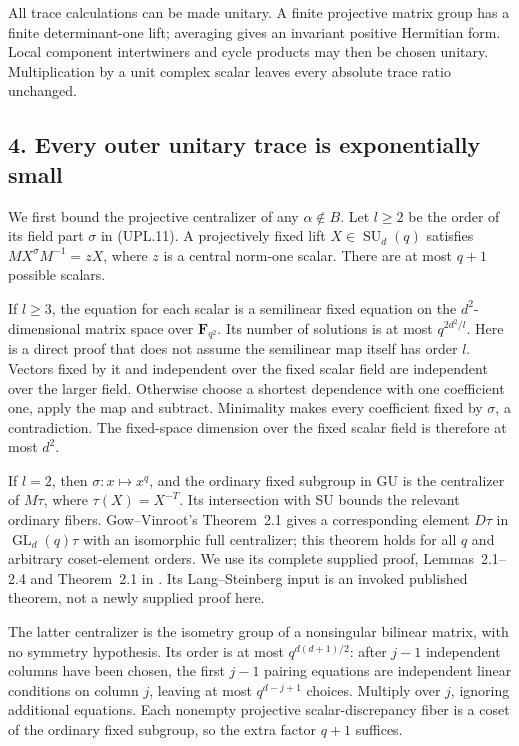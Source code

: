 All trace calculations can be made unitary. A finite projective
matrix group has a finite determinant-one lift; averaging gives an
invariant positive Hermitian form. Local component intertwiners and
cycle products may then be chosen unitary. Multiplication by a
unit complex scalar leaves every absolute trace ratio unchanged.

\subsection*{4. Every outer unitary trace is exponentially small}

We first bound the projective centralizer of any \(\alpha\notin B\).
Let \(l\ge2\) be the order of its field part \(\sigma\) in
(UPL.11). A projectively fixed lift \(X\in\operatorname{SU}_d(q)\)
satisfies \(M X^\sigma M^{-1}=zX\), where \(z\) is a central
norm-one scalar. There are at most \(q+1\) possible scalars.

If \(l\ge3\), the equation for each scalar is a semilinear fixed
equation on the \(d^2\)-dimensional matrix space over
\(\mathbf F_{q^2}\). Its number of solutions is at most
\(q^{2d^2/l}\). Here is a direct proof that does not assume the
semilinear map itself has order \(l\). Vectors fixed by it and
independent over the fixed scalar field are independent over the
larger field. Otherwise choose a shortest dependence with one
coefficient one, apply the map and subtract. Minimality makes every
coefficient fixed by \(\sigma\), a contradiction. The fixed-space
dimension over the fixed scalar field is therefore at most \(d^2\).

If \(l=2\), then \(\sigma:x\mapsto x^q\), and the ordinary fixed
subgroup in GU is the centralizer of \(M\tau\), where
\(\tau(X)=X^{-T}\). Its intersection with SU bounds the relevant
ordinary fibers. Gow--Vinroot's Theorem~2.1 gives a corresponding
element \(D\tau\) in \(\operatorname{GL}_d(q)\tau\) with an
isomorphic full centralizer; this theorem holds for all \(q\) and
arbitrary coset-element orders. We use its complete supplied proof,
Lemmas~2.1--2.4 and Theorem~2.1 in
\cite[author pp.~3--6]{UPL:GowVinroot2008}.
Its Lang--Steinberg input is an invoked published theorem, not a
newly supplied proof here.

The latter centralizer is the isometry group of a nonsingular
bilinear matrix, with no symmetry hypothesis. Its order is at most
\(q^{d(d+1)/2}\): after \(j-1\) independent columns have been
chosen, the first \(j-1\) pairing equations are independent linear
conditions on column \(j\), leaving at most \(q^{d-j+1}\) choices.
Multiply over \(j\), ignoring additional equations. Each nonempty
projective scalar-discrepancy fiber is a coset of the ordinary
fixed subgroup, so the extra factor \(q+1\) suffices.

